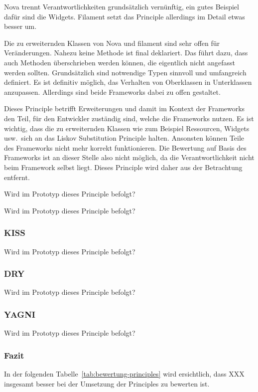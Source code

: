 Nova trennt Verantwortlichkeiten grundsätzlich vernünftig, ein gutes Beispiel dafür sind die Widgets.
Filament setzt das Principle allerdings im Detail etwas besser um.

\color{red}
Die zu erweiternden Klassen von Nova und filament sind sehr offen für Veränderungen.
Nahezu keine Methode ist final deklariert.
Das führt dazu, dass auch Methoden überschrieben werden können, die eigentlich nicht angefasst werden sollten.
Grundsätzlich sind notwendige Typen sinnvoll und umfangreich definiert.
Es ist definitiv möglich, das Verhalten von Oberklassen in Unterklassen anzupassen.
Allerdings sind beide Frameworks dabei zu offen gestaltet.

Dieses Principle betrifft Erweiterungen und damit im Kontext der Frameworks den Teil, für den Entwickler zuständig sind, welche die Frameworks nutzen.
Es ist wichtig, dass die zu erweiternden Klassen wie zum Beispiel Ressourcen, Widgets usw.\ sich an das Liskov Substitution Principle halten.
Ansonsten können Teile des Frameworks nicht mehr korrekt funktionieren.
Die Bewertung auf Basis des Frameworks ist an dieser Stelle also nicht möglich, da die Verantwortlichkeit nicht beim Framework selbst liegt.
Dieses Principle wird daher aus der Betrachtung entfernt.

Wird im Prototyp dieses Principle befolgt?

Wird im Prototyp dieses Principle befolgt?

\subsubsection{KISS}
Wird im Prototyp dieses Principle befolgt?

\subsubsection{DRY}
Wird im Prototyp dieses Principle befolgt?

\subsubsection{YAGNI}
Wird im Prototyp dieses Principle befolgt?

\subsubsection{Fazit}
In der folgenden Tabelle~\ref{tab:bewertung-principles} wird ersichtlich, dass XXX insgesamt besser bei der Umsetzung der Principles zu bewerten ist.

